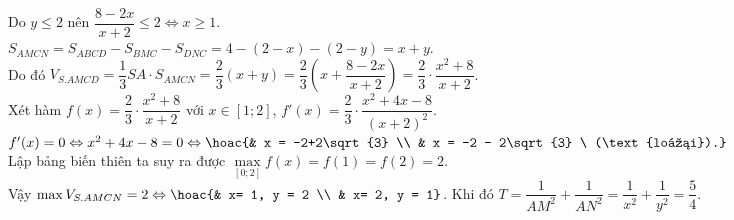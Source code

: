 \begin{ex}
{{
		}
		\noindent Do $y \le 2$ nên $\dfrac{8-2x}{x+2} \le 2 \Leftrightarrow x \ge 1$.\\
		$S_{AMCN} = S_{ABCD} - S_{BMC} - S_{DNC} = 4 - (2-x) - (2-y) = x+ y$.\\
		Do đó $V_{S.AMCD} = \dfrac{1}{3} SA \cdot S_{AMCN} = \dfrac{2}{3}( x+y) = \dfrac{2}{3} \left( x + \dfrac{8-2x}{x+2} \right) = \dfrac{2}{3} \cdot \dfrac{x^2+8}{x+2}$.\\
		Xét hàm $f(x) = \dfrac{2}{3} \cdot \dfrac{x^2+8}{x+2}$ với $x \in [1;2]$, $f'(x) = \dfrac{2}{3} \cdot \dfrac{x^2 + 4x - 8}{(x+2)^2}$.\\
		$f'(x) = 0 \Leftrightarrow x^2 + 4x - 8 = 0 \Leftrightarrow \hoac{& x = -2+2\sqrt{3} \\ & x = -2 - 2\sqrt{3} \ (\text{loại}).}$\\
		Lập bảng biến thiên ta suy ra được $\displaystyle \max \limits_{[0;2]} f(x) = f(1) = f(2) = 2$.\\
		Vậy $\max V_{S.AMCN} = 2 \Leftrightarrow \hoac{& x= 1, y = 2 \\ & x= 2, y = 1}$. Khi đó $T = \dfrac{1}{AM^2} + \dfrac{1}{AN^2} = \dfrac{1}{x^2} + \dfrac{1}{y^2} = \dfrac{5}{4}$.
	}
\end{ex}
